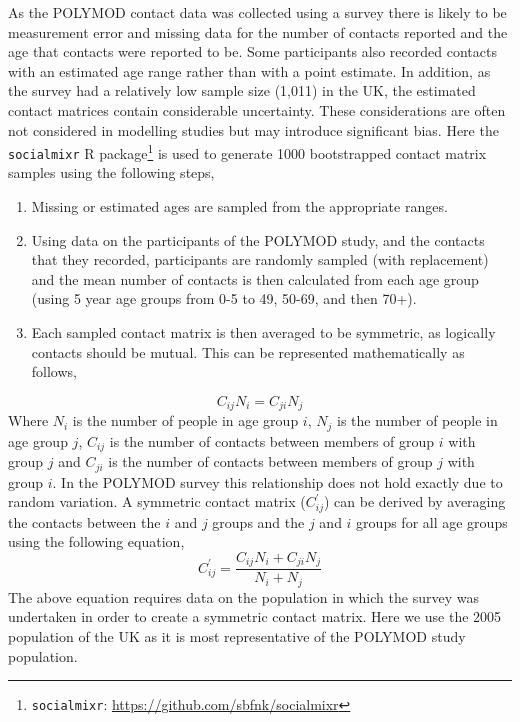 \documentclass[11pt,twoside]{bristolthesis}
\begin{document}
  As the POLYMOD contact data was collected using a survey there is likely to be measurement error and missing data for the number of contacts reported and the age that contacts were reported to be. Some participants also recorded contacts with an estimated age range rather than with a point estimate. In addition, as the survey had a relatively low sample size (1,011) in the UK, the estimated contact matrices contain considerable uncertainty. These considerations are often not considered in modelling studies but may introduce significant bias. Here the \texttt{socialmixr} R package\footnote{\texttt{socialmixr}: \url{https://github.com/sbfnk/socialmixr}} is used to generate 1000 bootstrapped contact matrix samples using the following steps,
  \begin{enumerate}
  \def\labelenumi{\arabic{enumi}.}
  \item
    Missing or estimated ages are sampled from the appropriate ranges.
  \item
    Using data on the participants of the POLYMOD study, and the contacts that they recorded, participants are randomly sampled (with replacement) and the mean number of contacts is then calculated from each age group (using 5 year age groups from 0-5 to 49, 50-69, and then 70+).
  \item
    Each sampled contact matrix is then averaged to be symmetric, as logically contacts should be mutual. This can be represented mathematically as follows,
  \end{enumerate}
  \begin{equation} 
    C_{ij}N_i = C_{ji}N_j
    \label{eq:symmideal}
  \end{equation}
  Where \(N_i\) is the number of people in age group \(i\), \(N_j\) is the number of people in age group \(j\), \(C_{ij}\) is the number of contacts between members of group \(i\) with group \(j\) and \(C_{ji}\) is the number of contacts between members of group \(j\) with group \(i\). In the POLYMOD survey this relationship does not hold exactly due to random variation. A symmetric contact matrix (\(C^{\prime}_{ij}\)) can be derived by averaging the contacts between the \(i\) and \(j\) groups and the \(j\) and \(i\) groups for all age groups using the following equation,
  \begin{equation} 
    C^{\prime}_{ij} = \frac{C_{ij}N_i + C_{ji}N_j}{N_i + N_j}
    \label{eq:symmfull}
  \end{equation}
  The above equation requires data on the population in which the survey was undertaken in order to create a symmetric contact matrix. Here we use the 2005 population of the UK as it is most representative of the POLYMOD study population.
  
\end{document}

